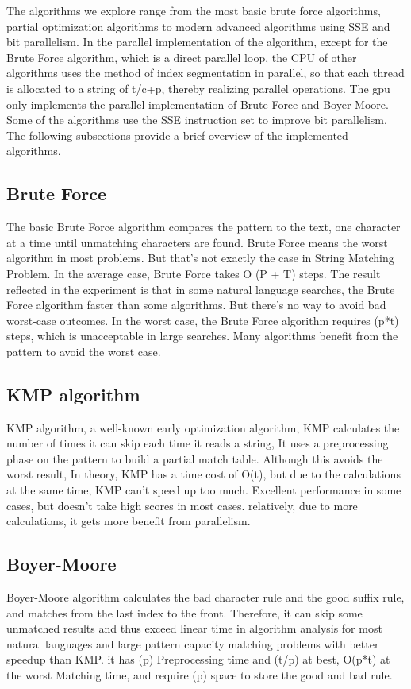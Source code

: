 \documentclass[11pt]{article}       %
\begin{document}
The algorithms we explore range from the most basic brute force algorithms, partial optimization algorithms to modern advanced algorithms using SSE and bit parallelism. In the parallel implementation of the algorithm, except for the Brute Force algorithm, which is a direct parallel loop, the CPU of other algorithms uses the method of index segmentation in parallel, so that each thread is allocated to a string of t/c+p, thereby realizing parallel operations. The gpu only implements the parallel implementation of Brute Force and Boyer-Moore. Some of the algorithms use the SSE instruction set to improve bit parallelism. The following subsections provide a brief overview of the implemented algorithms.


\subsection{Brute Force}\label{bf}
The basic Brute Force algorithm compares the pattern to the text, one character at a time until unmatching characters are found. Brute Force means the worst algorithm in most problems. But that's not exactly the case in String Matching Problem. In the average case, Brute Force takes O (P + T) steps. The result reflected in the experiment is that in some natural language searches, the Brute Force algorithm faster than some algorithms. But there's no way to avoid bad worst-case outcomes. In the worst case, the Brute Force algorithm requires (p*t) steps, which is unacceptable in large searches. Many algorithms benefit from the pattern to avoid the worst case.

\subsection{KMP algorithm}\label{kmp}
KMP algorithm, a well-known early optimization algorithm, KMP calculates the number of times it can skip each time it reads a string, It uses a preprocessing phase on the pattern to build a partial match table. Although this avoids the worst result, In theory, KMP has a time cost of O(t), but due to the calculations at the same time, KMP can’t speed up too much. Excellent performance in some cases, but doesn’t take high scores in most cases. relatively, due to more calculations, it gets more benefit from parallelism.

\subsection{Boyer-Moore}\label{bm}
Boyer-Moore algorithm calculates the bad character rule and the good suffix rule, and matches from the last index to the front. Therefore, it can skip some unmatched results and thus exceed linear time in algorithm analysis for most natural languages and large pattern capacity matching problems with better speedup than KMP. it has (p) Preprocessing time and  (t/p) at best, O(p*t) at the worst Matching time, and require (p) space to store the good and bad rule.
\end{document}
